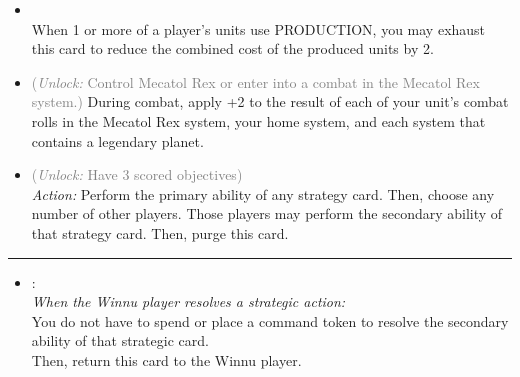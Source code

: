 \begin{multicols}{2}
\begin{itemize}
\item {}\\
When 1 or more of a player's units use PRODUCTION, you may exhaust this card to reduce the combined cost of the produced units by 2.
\item {} \textcolor{gray}{(\emph{Unlock:} Control Mecatol Rex or enter into a combat in the Mecatol Rex system.)}
During combat, apply +2 to the result of each of your unit's combat rolls in the Mecatol Rex system, your home system, and each system that contains a legendary planet.
\item {} \textcolor{gray}{(\emph{Unlock:} Have 3 scored objectives)}\\
\emph{Action:} Perform the primary ability of any strategy card. Then, choose any number of other players. Those players may perform the secondary ability of that strategy card. Then, purge this card. 
\end{itemize}

\vspace{-10pt}\rule{\hsize}{0.4pt}\vspace{5pt}


\begin{itemize}
\item {}:\\
\emph{When the Winnu player resolves a strategic action:}\\
You do not have to spend or place a command token to resolve the secondary ability of that strategic card.\\
Then, return this card to the Winnu player.
\end{itemize}

\end{multicols}




